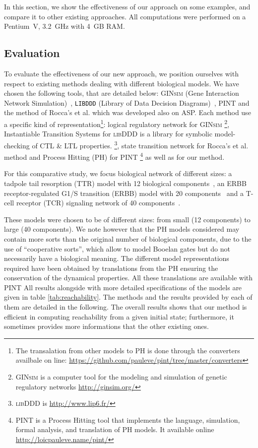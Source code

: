 In this section, we show the effectiveness of our approach on some examples,
and compare it to other existing approaches.
All computations were performed on a Pentium~V, 3.2~GHz with 4~GB RAM.

\subsection{Evaluation}
To evaluate the effectiveness of our new approach,
we position ourselves with respect to existing methods dealing with different biological models.
We have chosen the following tools, that are detailed below: 
\textsc{GINsim} (Gene Interaction Network Simulation)~\cite{gonzalez2006ginsim,naldi2009logical,naldi2007decision},
\texttt{LIBDDD} (Library of Data Decision Diagrams)~\cite{thierry2009hierarchical,colange2013towards},  PINT \cite{PMR12-MSCS} and the method of Rocca's et al. \cite{roccaasp} which was developed also on ASP.
 
Each method use a specific kind of representation\footnote{The transalation from other models to PH is done through the converters availbale on line: \url{https://github.com/pauleve/pint/tree/master/converters}}:
logical regulatory network for \textsc{GINsim} \footnote{\textsc{GINsim} is a computer tool for the modeling and simulation of genetic regulatory networks \url{http://ginsim.org/} },
Instantiable Transition Systems for \textsc{libDDD} is a library for symbolic model-checking of CTL \& LTL properties. \footnote{\textsc{libDDD} is \url{http://www.lip6.fr/} },
state transition network for Rocca's et al. method
and Process Hitting (PH) for \textsc{PINT} \footnote{\textsc{PINT} is a Process Hitting tool that implements the language, simulation, formal analysis, and translation of PH models. It available online \url{http://loicpauleve.name/pint/} } as well as for our method.

For this comparative study, we focus biological network of different sizes:
a tadpole tail resorption (TTR) model with 12 biological components~\cite{khalis2009smbionet},
an ERBB receptor-regulated G1/S transition (ERBB) model with 20 components~\cite{Samaga2009}
and a T-cell receptor (TCR) signaling network of 40 components~\cite{Klamt06}.

These models were chosen to be of different sizes:
from small (12 components) to large (40 components).
We note however that the PH models considered may contain more sorts than
the original number of biological components, due to the use of
“cooperative sorts”, which allow to model Booelan gates but do not necessarily
have a biological meaning.
The different model representations required have been obtained by translations
from the PH
ensuring the conservation of the dynamical properties.
All these translations are available with \textsc{PINT} 
All results alongside with more detailed specifications of the models
are given in table \ref{tab:reachability}.
The methods and the results provided by each of them are detailed in the following.
The overall results shows that our method is efficient in computing reachability
from a given initial state;
furthermore, it sometimes provides more informations that the other existing ones.


